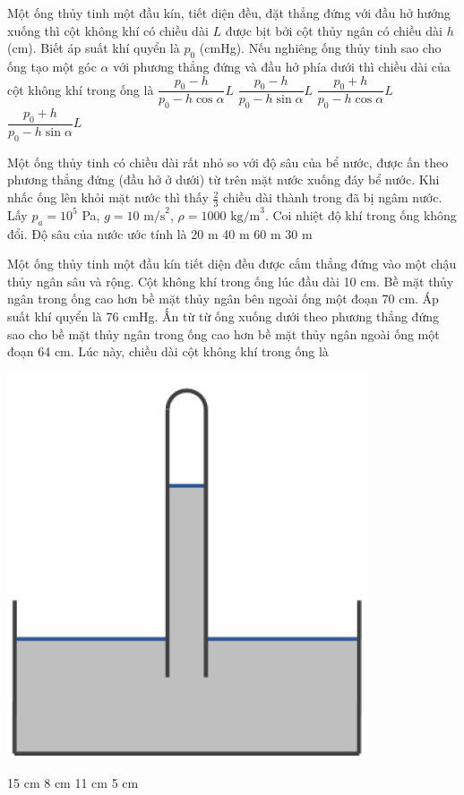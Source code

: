 \documentclass[12pt,a4paper]{article}
\begin{document}
\begin{multicols}{2}
	\begin{ex}
		Một ống thủy tinh một đầu kín, tiết diện đều, đặt thẳng đứng với đầu hở hướng xuống thì cột không khí có chiều dài $L$ được bịt bởi cột thủy ngân có chiều dài $h$ (cm). Biết áp suất khí quyển là $p_0$ (cmHg). Nếu nghiêng ống thủy tinh sao cho ống tạo một góc $\alpha$ với phương thẳng đứng và đầu hở phía dưới thì chiều dài của cột không khí trong ống là
		\choice
		{$\dfrac{p_0-h}{p_0-h\cos\alpha}L$}
		{$\dfrac{p_0-h}{p_0-h\sin\alpha}L$}
		{$\dfrac{p_0+h}{p_0-h\cos\alpha}L$}
		{$\dfrac{p_0+h}{p_0-h\sin\alpha}L$}
	\end{ex}
	
	\begin{ex}
		Một ống thủy tinh có chiều dài rất nhỏ so với độ sâu của bể nước, được ấn theo phương thẳng đứng (đầu hở ở dưới) từ trên mặt nước xuống đáy bể nước. Khi nhấc ống lên khỏi mặt nước thì thấy $\frac{2}{3}$ chiều dài thành trong đã bị ngâm nước. Lấy $p_a = 10^5$ Pa, $g=10 \text{ m/s}^2$, $\rho = 1000 \text{ kg/m}^3$. Coi nhiệt độ khí trong ống không đổi. Độ sâu của nước ước tính là
		\choice
		{20 m}
		{40 m}
		{60 m}
		{30 m}
	\end{ex}
	
	\begin{ex}
		Một ống thủy tinh một đầu kín tiết diện đều được cắm thẳng đứng vào một chậu thủy ngân sâu và rộng. Cột không khí trong ống lúc đầu dài 10 cm. Bề mặt thủy ngân trong ống cao hơn bề mặt thủy ngân bên ngoài ống một đoạn 70 cm. Áp suất khí quyển là 76 cmHg. Ấn từ từ ống xuống dưới theo phương thẳng đứng sao cho bề mặt thủy ngân trong ống cao hơn bề mặt thủy ngân ngoài ống một đoạn 64 cm. Lúc này, chiều dài cột không khí trong ống là
			\begin{center}
			\includegraphics[scale=0.3]{img/8.png}
		\end{center}
		\choice
		{15 cm}
		{8 cm}
		{11 cm}
		{5 cm}
	\end{ex}
	

\end{multicols}
\end{document}
